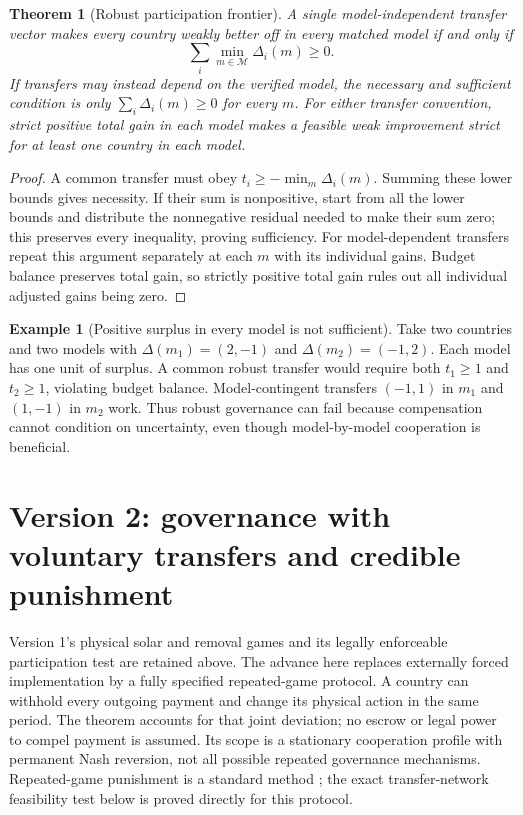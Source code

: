 \documentclass[11pt]{article}
\newtheorem{theorem}{Theorem}
\theoremstyle{definition}
\newtheorem{example}{Example}
\begin{document}
\begin{theorem}[Robust participation frontier]
A single model-independent transfer vector makes every country weakly better off in every matched model if and only if
\[
 \sum_i\min_{m\in\mathcal M}\Delta_i(m)\geq0.
\]
If transfers may instead depend on the verified model, the necessary and sufficient condition is only $\sum_i\Delta_i(m)\geq0$ for every $m$. For either transfer convention, strict positive total gain in each model makes a feasible weak improvement strict for at least one country in each model.
\end{theorem}
\begin{proof}
A common transfer must obey $t_i\geq-\min_m\Delta_i(m)$. Summing these lower bounds gives necessity. If their sum is nonpositive, start from all the lower bounds and distribute the nonnegative residual needed to make their sum zero; this preserves every inequality, proving sufficiency. For model-dependent transfers repeat this argument separately at each $m$ with its individual gains. Budget balance preserves total gain, so strictly positive total gain rules out all individual adjusted gains being zero.
\end{proof}

\begin{example}[Positive surplus in every model is not sufficient]
Take two countries and two models with $\Delta(m_1)=(2,-1)$ and $\Delta(m_2)=(-1,2)$. Each model has one unit of surplus. A common robust transfer would require both $t_1\geq1$ and $t_2\geq1$, violating budget balance. Model-contingent transfers $(-1,1)$ in $m_1$ and $(1,-1)$ in $m_2$ work. Thus robust governance can fail because compensation cannot condition on uncertainty, even though model-by-model cooperation is beneficial.
\end{example}


\section*{Version 2: governance with voluntary transfers and credible punishment}
Version 1's physical solar and removal games and its legally enforceable
participation test are retained above. The advance here replaces externally
forced implementation by a fully specified repeated-game protocol. A country
can withhold every outgoing payment and change its physical action in the
same period. The theorem accounts for that joint deviation; no escrow or
legal power to compel payment is assumed. Its scope is a stationary
cooperation profile with permanent Nash reversion, not all possible repeated
governance mechanisms. Repeated-game punishment is a standard method
\cite{fudenbergmaskin}; the exact transfer-network feasibility test below is
proved directly for this protocol.
\end{document}
